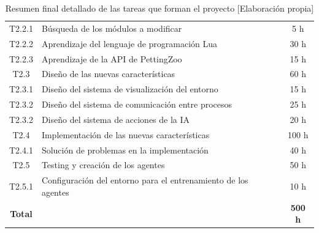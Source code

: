\begin{table}[]
\begin{center}
\begin{tabular}{| c | l | c |}
			T2.2.1          & Búsqueda de los módulos a modificar                            & 5 h             \\
			T2.2.2          & Aprendizaje del lenguaje de programación Lua                   & 30 h            \\
			T2.2.3          & Aprendizaje de la API de PettingZoo                            & 15 h            \\ \hline
			T2.3            & Diseño de las nuevas características                           & 60 h            \\ \hline
			T2.3.1          & Diseño del sistema de visualización del entorno                & 15 h            \\
			T2.3.2          & Diseño del sistema de comunicación entre procesos              & 25 h            \\
			T2.3.2          & Diseño del sistema de acciones de la IA                        & 20 h            \\ \hline
			T2.4            & Implementación de las nuevas características                   & 100 h            \\ \hline
			T2.4.1          & Solución de problemas en la implementación                     & 40 h            \\\hline

			T2.5            & Testing y creación de los agentes                              & 50 h            \\ \hline
			T2.5.1          & Configuración del entorno para el entrenamiento de los agentes & 10 h            \\
			\hline
			\textbf{Total}  &                                                                & \textbf{500 h}  \\
			\hline
		\end{tabular}
		\caption{Resumen final detallado de las tareas que forman el proyecto [Elaboración propia]}
		\label{tab:planificacion-2}
	\end{center}
\end{table}



